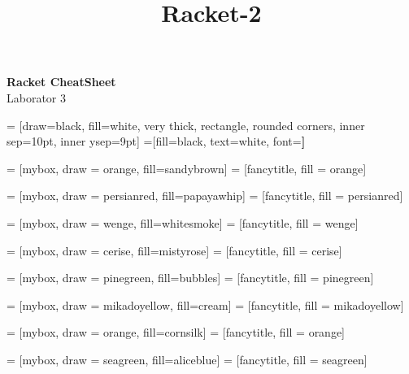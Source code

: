 \documentclass[a4paper]{article}
\title{Racket-2}
\begin{document}
\begin{center}{\huge{\textbf{Racket CheatSheet}}}\\
{\large Laborator 3}
\end{center}
\begin{multicols*}{3}

 = [draw=black, fill=white, very thick,
    rectangle, rounded corners, inner sep=10pt, inner ysep=9pt]
 =[fill=black, text=white, font=\bfseries]

 = [mybox, draw = orange, fill=sandybrown]
 = [fancytitle, fill = orange]


 = [mybox, draw = persianred, fill=papayawhip]
 = [fancytitle, fill = persianred]

 = [mybox, draw = wenge, fill=whitesmoke]
 = [fancytitle, fill = wenge]

 = [mybox, draw = cerise, fill=mistyrose]
 = [fancytitle, fill = cerise]

 = [mybox, draw = pinegreen, fill=bubbles]
 = [fancytitle, fill = pinegreen]

 = [mybox, draw = mikadoyellow, fill=cream]
 = [fancytitle, fill = mikadoyellow]

 = [mybox, draw = orange, fill=cornsilk]
 = [fancytitle, fill = orange]

 = [mybox, draw = seagreen, fill=aliceblue]
 = [fancytitle, fill = seagreen]


\end{multicols*}
\end{document}
